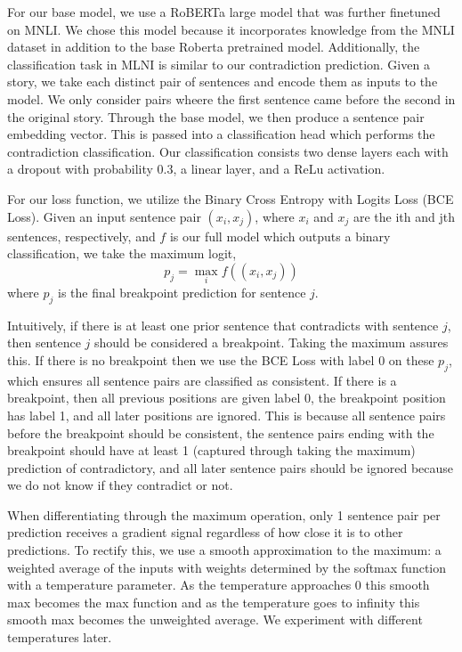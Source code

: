 \documentclass[11pt,a4paper]{article}
\begin{document}
For our base model, we use a RoBERTa large model that was further finetuned on MNLI. We chose this model because it incorporates knowledge from the MNLI dataset in addition to the base Roberta pretrained model. Additionally, the classification task in MLNI is similar to our contradiction prediction. Given a story, we take each distinct pair of sentences and encode them as inputs to the model. We only consider pairs wheere the first sentence came before the second in the original story. Through the base model, we then produce a sentence pair embedding vector. This is passed into a classification head which performs the contradiction classification. Our classification consists two dense layers each with a dropout with probability 0.3, a linear layer, and a ReLu \citep{agarap2019deep} activation.

For our loss function, we utilize the Binary Cross Entropy with Logits Loss (BCE Loss). Given an input sentence pair $(x_i, x_j)$, where $x_i$ and $x_j$ are the ith and jth sentences, respectively, and $f$ is our full model which outputs a binary classification, we take the maximum logit, 
$$p_j = \max_i f((x_i, x_j))$$
where $p_j$ is the final breakpoint prediction for sentence $j$. 

Intuitively, if there is at least one prior sentence that contradicts with sentence $j$, then sentence $j$ should be considered a breakpoint. Taking the maximum assures this. If there is no breakpoint then we use the BCE Loss with label 0 on these $p_j$, which ensures all sentence pairs are classified as consistent. If there is a breakpoint, then all previous positions are given label 0, the breakpoint position has label 1, and all later positions are ignored. This is because all sentence pairs before the breakpoint should be consistent, the sentence pairs ending with the breakpoint should have at least 1 (captured through taking the maximum) prediction of contradictory, and all later sentence pairs should be ignored because we do not know if they contradict or not.

When differentiating through the maximum operation, only 1 sentence pair per prediction receives a gradient signal regardless of how close it is to other predictions. To rectify this, we use a smooth approximation to the maximum: a weighted average of the inputs with weights determined by the softmax function with a temperature parameter. As the temperature approaches 0 this smooth max becomes the max function and as the temperature goes to infinity this smooth max becomes the unweighted average. We experiment with different temperatures later. 
\end{document}
